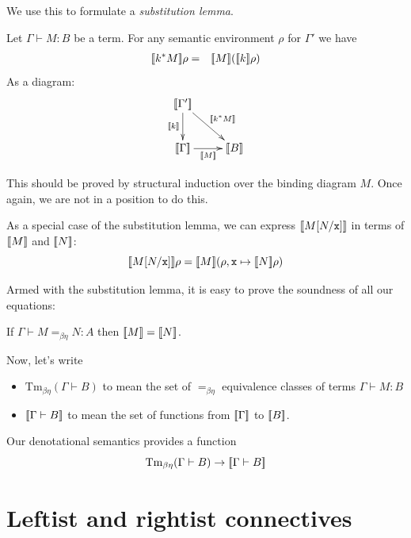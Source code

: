\documentclass[runningheads,12pt]{llncs}
\newcommand{\eqbe}{=_{\beta\eta}}
\newcommand{\termsofbe}[1]{\mathrm{Tm}_{\beta\eta}({#1})}
\begin{document}
We use this to formulate a \emph{substitution lemma}.  
\begin{lemma}
Let $\Gamma \vdash M : B$ be a term. \newline
 For any semantic environment $\rho$ for $\Gamma'$ we have
  \begin{eqnarray*}
    [\![ {k^{*}M} ]\!]\rho & = & [\![ {M} ]\!]([\![ {k} ]\!]\rho)
  \end{eqnarray*}
  As a diagram:
  \begin{displaymath}
    \xymatrix{
      \seman{\Gamma'} \ar[d]_{\seman{k}} \ar[dr]^{\seman{k^*M}} & \\
      \seman{\Gamma} \ar[r]_-{\seman{M}} & \seman{B} \\
    }
  \end{displaymath}
\end{lemma}

This should be proved by structural induction over the binding diagram $M$.  Once again, we are not in a position to do this.

As a special case of the substitution lemma, we can express $[\![ {M[N/\mathtt{x}]} ]\!]$ in terms of $[\![ {M} ]\!]$ and $[\![ {N} ]\!]$:
\begin{displaymath}
  [\![ {M[N/\mathtt{x}]} ]\!]\rho = [\![ {M} ]\!](\rho,\mathtt{x}\mapsto [\![ {N} ]\!]\rho)
\end{displaymath}

Armed with the substitution lemma, it is easy to prove the soundness of all our equations:
\begin{proposition}
  If $\Gamma \vdash M \eqbe N : A$ then $[\![ {M} ]\!] = [\![ {N} ]\!]$. 
\end{proposition}

Now, let's write
\begin{itemize}\item 
  $\termsofbe{\Gamma \vdash B}$ to mean the set of $\eqbe$ equivalence classes of terms $\Gamma \vdash
  M : B$ 
\item $[\![ {\Gamma \vdash B} ]\!]$ to mean the set
  of functions from $[\![ {\Gamma} ]\!]$ to $[\![ {B} ]\!]$.
\end{itemize}
Our denotational semantics provides a function
\begin{displaymath}
  \termsofbe{\Gamma \vdash B} \to \seman{\Gamma \vdash B}
\end{displaymath}

\section{Leftist and rightist connectives}
\end{document}
